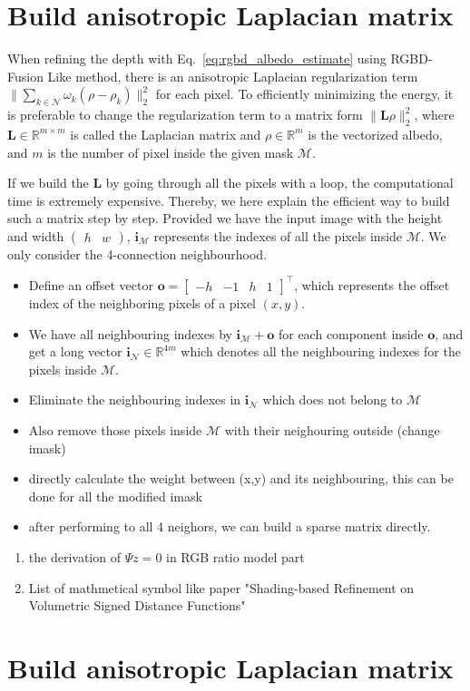 \chapter{Build anisotropic Laplacian matrix}\label{appendix:implement}

When refining the depth with Eq.~\ref{eq:rgbd_albedo_estimate} using RGBD-Fusion Like method, there is an anisotropic Laplacian regularization term $\lVert \sum_{k \in \mathcal{N}} \omega_k (\rho - \rho_k) \rVert^2_2$ for each pixel.
To efficiently minimizing the energy, it is preferable to change the regularization term to a matrix form $\lVert \mathbf{L}\rho \rVert^2_2$, where $\mathbf{L}\in \mathbb{R}^{m\times m}$ is called the Laplacian matrix and $\rho\in\mathbb{R}^m$ is the vectorized albedo, and $m$ is the number of pixel inside the given mask $\mathcal{M}$.

If we build the $\mathbf{L}$ by going through all the pixels with a loop, the computational time is extremely expensive.
Thereby, we here explain the efficient way to build such a matrix step by step.
Provided we have the input image with the height and width $\begin{pmatrix} h &w \end{pmatrix}$, $\mathbf{i}_\mathcal{M}$ represents the indexes of all the pixels inside $\mathcal{M}$. We only consider the 4-connection neighbourhood. 

 \begin{itemize}
        \item Define an offset vector $ \mathbf{o} = \begin{bmatrix} -h& -1& h& 1 \end{bmatrix}^\top$, which represents the offset index of the neighboring pixels of a pixel $(x,y)$.
        \item We have all neighbouring indexes by $\mathbf{i}_\mathcal{M} + \mathbf{o}$ for each component inside $\mathbf{o}$, and get a long vector $\mathbf{i}_{\mathcal{N}}\in\mathbb{R}^{4m}$ which denotes all the neighbouring indexes for the pixels inside $\mathcal{M}$.
        \item Eliminate the neighbouring indexes in $\mathbf{i}_{\mathcal{N}}$ which does not belong to $\mathcal{M}$
        \item Also remove those pixels inside $\mathcal{M}$ with their neighouring outside (change imask)
        \item directly calculate the weight between (x,y) and its neighbouring, this can be done for all the modified imask
        \item after performing to all 4 neighors, we can build a sparse matrix directly.
    \end{itemize}
   

\begin{enumerate}
   
    
    
    \item the derivation of $\Psi z = 0$ in RGB ratio model part
    \item List of mathmetical symbol like paper "Shading-based Refinement on Volumetric Signed Distance Functions"
\end{enumerate}


\chapter{Build anisotropic Laplacian matrix}\label{appendix:dd}
